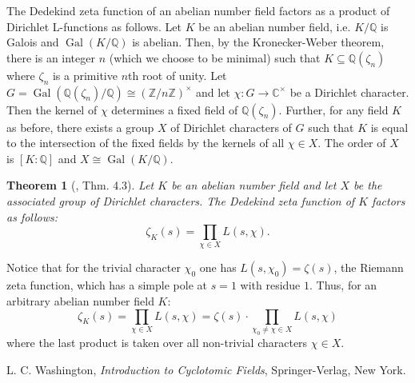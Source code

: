\documentclass[12pt]{article}
\newtheorem*{thm}{Theorem}
\theoremstyle{definition}
\newcommand{\Ints}{\mathbb{Z}}
\newcommand{\Complex}{\mathbb{C}}
\newcommand{\Rats}{\mathbb{Q}}
\newcommand{\Gal}{\operatorname{Gal}}
\begin{document}
The Dedekind zeta function of an abelian number field
factors as a product of Dirichlet L-functions as follows. Let $K$
be an abelian number field, i.e. $K/\Rats$ is Galois and
$\Gal(K/\Rats)$ is abelian. Then, by the Kronecker-Weber theorem,
there is an integer $n$ (which we choose to be minimal) such that
$K\subseteq \Rats(\zeta_n)$ where $\zeta_n$ is a primitive $n$th
root of unity. Let $G=\Gal(\Rats(\zeta_n)/\Rats)\cong
(\Ints/n\Ints)^\times$ and let $\chi:G\to \Complex^\times$ be a
Dirichlet character. Then the kernel of $\chi$ determines a fixed
field of $\Rats(\zeta_n)$. Further, for any field $K$ as before,
there exists a group $X$ of Dirichlet characters of $G$ such that
$K$ is equal to the intersection of the fixed fields by the
kernels of all $\chi\in X$. The order of $X$ is $[K:\Rats]$ and
$X\cong \Gal(K/\Rats)$.

\begin{thm}[\cite{wash}, Thm. 4.3]
\label{factor} Let $K$ be an abelian number field and let $X$ be
the associated group of Dirichlet characters. The Dedekind zeta
function of $K$ factors as follows:
$$\zeta_K(s)=\prod_{\chi \in X} L(s,\chi).$$
\end{thm}
Notice that for the trivial character $\chi_0$ one has
$L(s,\chi_0)=\zeta(s)$, the Riemann zeta function, which has a
simple pole at $s=1$ with residue $1$. Thus, for an arbitrary
abelian number field $K$:
$$\zeta_K(s)=\prod_{\chi \in X}L(s,\chi)=\zeta(s)\cdot \prod_{\chi_0\neq \chi \in
X} L(s,\chi)$$ where the last product is taken over all
non-trivial characters $\chi \in X$.

\begin{thebibliography}{99}
 L. C. Washington, {\em Introduction to Cyclotomic Fields}, Springer-Verlag, New York.
\end{thebibliography}
\end{document}
